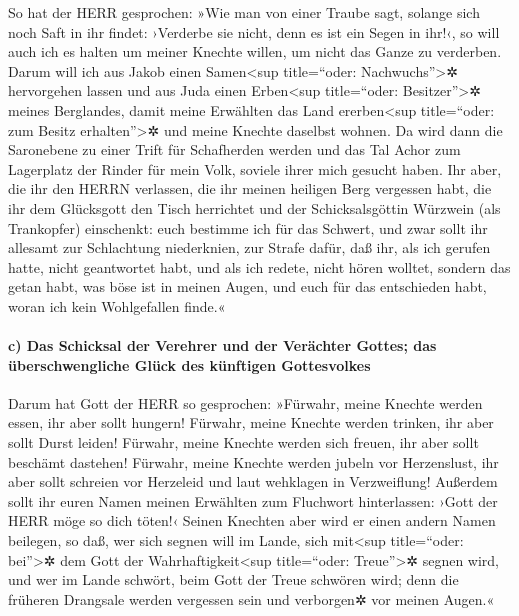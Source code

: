 So hat der HERR gesprochen: »Wie man von einer Traube
sagt, solange sich noch Saft in ihr findet: ›Verderbe sie nicht, denn es
ist ein Segen in ihr!‹, so will auch ich es halten um meiner Knechte
willen, um nicht das Ganze zu verderben. Darum will ich
aus Jakob einen Samen\textless sup title=``oder:
Nachwuchs''\textgreater✲ hervorgehen lassen und aus Juda einen
Erben\textless sup title=``oder: Besitzer''\textgreater✲ meines
Berglandes, damit meine Erwählten das Land ererben\textless sup
title=``oder: zum Besitz erhalten''\textgreater✲ und meine Knechte
daselbst wohnen. Da wird dann die Saronebene zu einer
Trift für Schafherden werden und das Tal Achor zum Lagerplatz der Rinder
für mein Volk, soviele ihrer mich gesucht haben. Ihr
aber, die ihr den HERRN verlassen, die ihr meinen heiligen Berg
vergessen habt, die ihr dem Glücksgott den Tisch herrichtet und der
Schicksalsgöttin Würzwein (als Trankopfer) einschenkt:
euch bestimme ich für das Schwert, und zwar sollt ihr
allesamt zur Schlachtung niederknien, zur Strafe dafür, daß ihr, als ich
gerufen hatte, nicht geantwortet habt, und als ich redete, nicht hören
wolltet, sondern das getan habt, was böse ist in meinen Augen, und euch
für das entschieden habt, woran ich kein Wohlgefallen finde.«

\hypertarget{c-das-schicksal-der-verehrer-und-der-veruxe4chter-gottes-das-uxfcberschwengliche-gluxfcck-des-kuxfcnftigen-gottesvolkes}{%
\paragraph{c) Das Schicksal der Verehrer und der Verächter Gottes; das
überschwengliche Glück des künftigen
Gottesvolkes}\label{c-das-schicksal-der-verehrer-und-der-veruxe4chter-gottes-das-uxfcberschwengliche-gluxfcck-des-kuxfcnftigen-gottesvolkes}}

Darum hat Gott der HERR so gesprochen: »Fürwahr, meine
Knechte werden essen, ihr aber sollt hungern! Fürwahr, meine Knechte
werden trinken, ihr aber sollt Durst leiden! Fürwahr, meine Knechte
werden sich freuen, ihr aber sollt beschämt dastehen!
Fürwahr, meine Knechte werden jubeln vor Herzenslust, ihr
aber sollt schreien vor Herzeleid und laut wehklagen in Verzweiflung!
Außerdem sollt ihr euren Namen meinen Erwählten zum
Fluchwort hinterlassen: ›Gott der HERR möge so dich töten!‹ Seinen
Knechten aber wird er einen andern Namen beilegen, so
daß, wer sich segnen will im Lande, sich mit\textless sup title=``oder:
bei''\textgreater✲ dem Gott der Wahrhaftigkeit\textless sup
title=``oder: Treue''\textgreater✲ segnen wird, und wer im Lande
schwört, beim Gott der Treue schwören wird; denn die früheren Drangsale
werden vergessen sein und verborgen✲ vor meinen Augen.«

